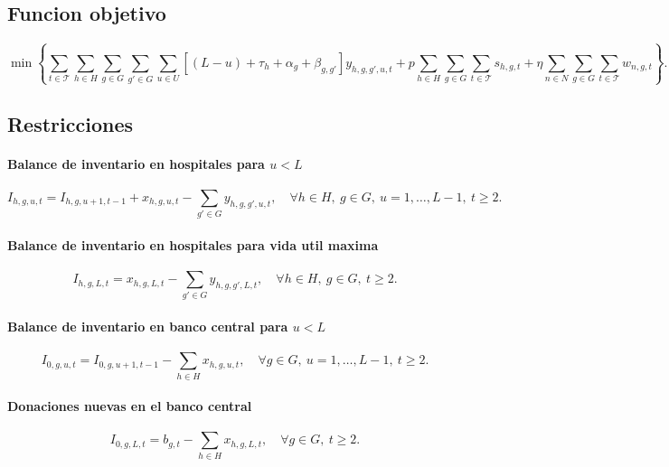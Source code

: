 \subsection{Funcion objetivo}

\begin{equation}
\min
\left\{
\sum_{t \in \mathcal{T}}
\sum_{h \in H}
\sum_{g \in G}
\sum_{g' \in G}
\sum_{u \in U}
\left[(L-u) + \tau_h + \alpha_g + \beta_{g,g'}\right] y_{h,g,g',u,t}
+ p \sum_{h \in H} \sum_{g \in G} \sum_{t \in \mathcal{T}} s_{h,g,t}
+ \eta \sum_{n \in N} \sum_{g \in G} \sum_{t \in \mathcal{T}} w_{n,g,t}
\right\}.
\end{equation}

\subsection{Restricciones}

\paragraph{Balance de inventario en hospitales para $u < L$}
\begin{equation}
I_{h,g,u,t}
= I_{h,g,u+1,t-1} + x_{h,g,u,t}
- \sum_{g' \in G} y_{h,g,g',u,t},
\quad \forall h \in H,\ g \in G,\ u=1,\dots,L-1,\ t \geq 2.
\end{equation}

\paragraph{Balance de inventario en hospitales para vida util maxima}
\begin{equation}
I_{h,g,L,t}
= x_{h,g,L,t} - \sum_{g' \in G} y_{h,g,g',L,t},
\quad \forall h \in H,\ g \in G,\ t \geq 2.
\end{equation}

\paragraph{Balance de inventario en banco central para $u < L$}
\begin{equation}
I_{0,g,u,t}
= I_{0,g,u+1,t-1} - \sum_{h \in H} x_{h,g,u,t},
\quad \forall g \in G,\ u=1,\dots,L-1,\ t \geq 2.
\end{equation}

\paragraph{Donaciones nuevas en el banco central}
\begin{equation}
I_{0,g,L,t}
= b_{g,t} - \sum_{h \in H} x_{h,g,L,t},
\quad \forall g \in G,\ t \geq 2.
\end{equation}

